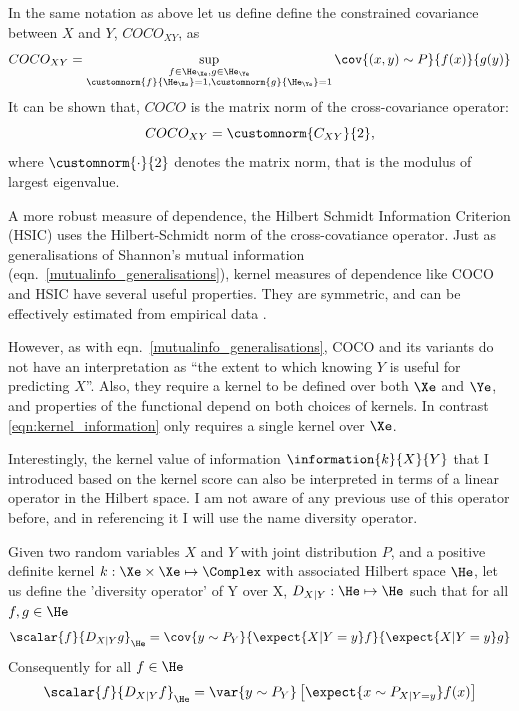 \begin{definition}
	In the same notation as above let us define define the constrained covariance between $X$ and $Y$, $COCO_{XY}$, as
	\begin{equation}
		COCO_{XY}=\sup_{\substack{f\in\He_\Xe, g\in\He_\Ye \\\customnorm{f}{\He_\Xe}=1,\customnorm{g}{\He_\Ye}=1}} \cov{(x,y)\sim P}{f(x)}{g(y)}
	\end{equation}
	It can be shown that, $COCO$ is the matrix norm of the cross-covariance operator:
	\begin{equation}
		COCO_{XY} = \customnorm{C_{XY}}{2},
	\end{equation}
	where $\customnorm{\cdot}{2}$ denotes the matrix norm, that is the modulus of largest eigenvalue. 
\end{definition}

A more robust measure of dependence, the Hilbert Schmidt Information Criterion (HSIC) uses the Hilbert-Schmidt norm of the cross-covatiance operator\citep{Gretton2005}. Just as generalisations of Shannon's mutual information (eqn.\ \eqref{mutualinfo_generalisations}), kernel measures of dependence like COCO and HSIC have several useful properties. They are symmetric, and can be effectively estimated from empirical data \citep{Gretton2005}.

However, as with eqn.\ \eqref{mutualinfo_generalisations}, COCO and its variants do not have an interpretation as ``the extent to which knowing $Y$ is useful for predicting $X$''. Also, they require a kernel to be defined over both $\Xe$ and $\Ye$, and properties of the functional depend on both choices of kernels. In contrast \eqref{eqn:kernel_information} only requires a single kernel over $\Xe$.

Interestingly, the kernel value of information $\information{k}{X}{Y}$ that I introduced based on the kernel score can also be interpreted in terms of a linear operator in the Hilbert space. I am not aware of any previous use of this operator before, and in referencing it I will use the name diversity operator.

\begin{definition}
Given two random variables $X$ and $Y$ with joint distribution $P$, and a positive definite kernel $k:\Xe\times\Xe\mapsto\Complex$ with associated Hilbert space $\He$, let us define the 'diversity operator' of Y over X, $D_{X\vert Y}:\He\mapsto\He$ such that for all $f,g\in\He$ 
\begin{align}
	\scalar{f}{D_{X\vert Y}g}_{\He} = \cov{y\sim P_Y}{\expect{X\vert Y=y} f}{\expect{X\vert Y=y} g}
\end{align}
Consequently for all $f\in\He$
\begin{align}
	\scalar{f}{D_{X\vert Y}f}_{\He} = \var{y\sim P_Y} \left[ \expect{x\sim P_{X\vert Y=y}} f(x) \right]
\end{align}
\end{definition}

